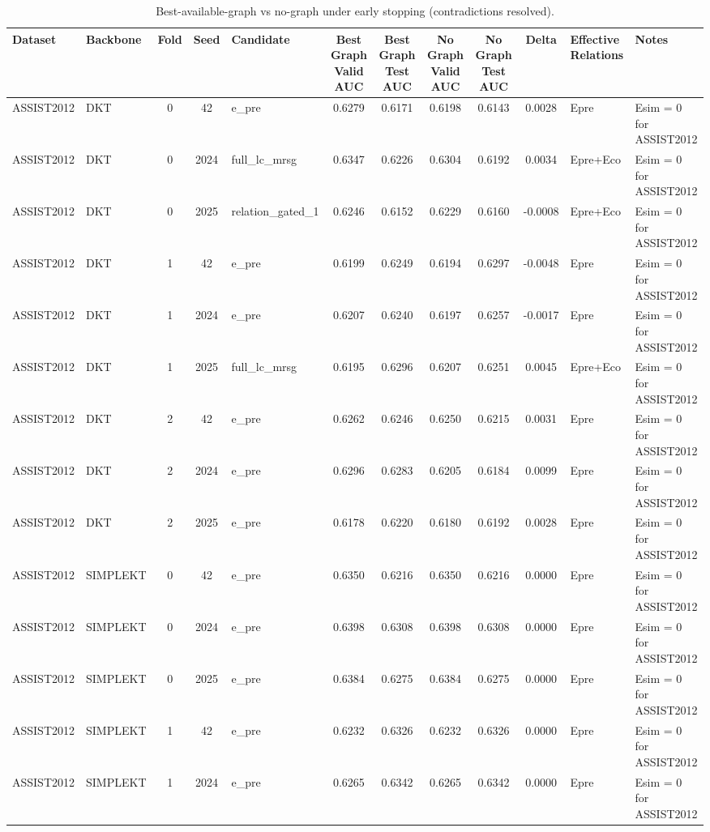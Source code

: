 \begin{table}[h]
\centering
\caption{Best-available-graph vs no-graph under early stopping (contradictions resolved).}
\label{tab:best_graph_vs_no_graph_early_stopping}
\begin{tabular}{llcclcccccl}
\toprule
Dataset & Backbone & Fold & Seed & Candidate & Best Graph Valid AUC & Best Graph Test AUC & No Graph Valid AUC & No Graph Test AUC & Delta & Effective Relations & Notes \\
\midrule
ASSIST2012 & DKT & 0 & 42 & e_pre & 0.6279 & 0.6171 & 0.6198 & 0.6143 & 0.0028 & Epre & Esim = 0 for ASSIST2012 \\
ASSIST2012 & DKT & 0 & 2024 & full_lc_mrsg & 0.6347 & 0.6226 & 0.6304 & 0.6192 & 0.0034 & Epre+Eco & Esim = 0 for ASSIST2012 \\
ASSIST2012 & DKT & 0 & 2025 & relation_gated_1 & 0.6246 & 0.6152 & 0.6229 & 0.6160 & -0.0008 & Epre+Eco & Esim = 0 for ASSIST2012 \\
ASSIST2012 & DKT & 1 & 42 & e_pre & 0.6199 & 0.6249 & 0.6194 & 0.6297 & -0.0048 & Epre & Esim = 0 for ASSIST2012 \\
ASSIST2012 & DKT & 1 & 2024 & e_pre & 0.6207 & 0.6240 & 0.6197 & 0.6257 & -0.0017 & Epre & Esim = 0 for ASSIST2012 \\
ASSIST2012 & DKT & 1 & 2025 & full_lc_mrsg & 0.6195 & 0.6296 & 0.6207 & 0.6251 & 0.0045 & Epre+Eco & Esim = 0 for ASSIST2012 \\
ASSIST2012 & DKT & 2 & 42 & e_pre & 0.6262 & 0.6246 & 0.6250 & 0.6215 & 0.0031 & Epre & Esim = 0 for ASSIST2012 \\
ASSIST2012 & DKT & 2 & 2024 & e_pre & 0.6296 & 0.6283 & 0.6205 & 0.6184 & 0.0099 & Epre & Esim = 0 for ASSIST2012 \\
ASSIST2012 & DKT & 2 & 2025 & e_pre & 0.6178 & 0.6220 & 0.6180 & 0.6192 & 0.0028 & Epre & Esim = 0 for ASSIST2012 \\
ASSIST2012 & SIMPLEKT & 0 & 42 & e_pre & 0.6350 & 0.6216 & 0.6350 & 0.6216 & 0.0000 & Epre & Esim = 0 for ASSIST2012 \\
ASSIST2012 & SIMPLEKT & 0 & 2024 & e_pre & 0.6398 & 0.6308 & 0.6398 & 0.6308 & 0.0000 & Epre & Esim = 0 for ASSIST2012 \\
ASSIST2012 & SIMPLEKT & 0 & 2025 & e_pre & 0.6384 & 0.6275 & 0.6384 & 0.6275 & 0.0000 & Epre & Esim = 0 for ASSIST2012 \\
ASSIST2012 & SIMPLEKT & 1 & 42 & e_pre & 0.6232 & 0.6326 & 0.6232 & 0.6326 & 0.0000 & Epre & Esim = 0 for ASSIST2012 \\
ASSIST2012 & SIMPLEKT & 1 & 2024 & e_pre & 0.6265 & 0.6342 & 0.6265 & 0.6342 & 0.0000 & Epre & Esim = 0 for ASSIST2012 \\

\end{tabular}
\end{table}
